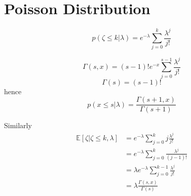 \section{Poisson Distribution}

\begin{equation}
	p(\zeta\leq k|\lambda) = e^{-\lambda}\sum_{j=0}^k\frac{\lambda^j}{j!}
\end{equation}

\begin{equation}
	\Gamma(s,x) = (s-1)!e^{-x}\sum_{j=0}^{s-1}\frac{\lambda^j}{j!}
\end{equation}
\begin{equation}
	\Gamma(s)= (s-1)!
\end{equation}
hence
\begin{equation}
	p(x\leq s|\lambda)=\frac{\Gamma(s+1,x)}{\Gamma(s+1)}
\end{equation}

Similarly
\begin{equation}
	\begin{split}
		\mathbb{E}[\zeta|\zeta\leq k,\lambda] &= e^{-\lambda}\sum_{j=0}^kj\frac{\lambda^j}{j!}\\
		& = e^{-\lambda}\sum_{j=0}^{k}\frac{\lambda^{j}}{(j-1)!}\\
		& = \lambda e^{-\lambda}\sum_{j=0}^{k-1}\frac{\lambda^{j}}{j!}\\
		& =\lambda \frac{\Gamma(s,x)}{\Gamma(s)}
	\end{split}
\end{equation}
